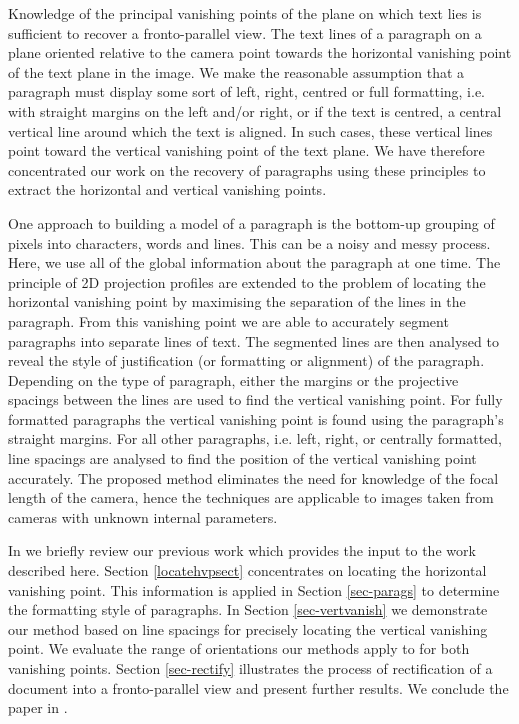 \documentclass{elsart}   %
\begin{document}
Knowledge of the principal vanishing points of the plane on which text lies is
sufficient to recover a fronto-parallel view. The text lines of a paragraph
on a plane oriented relative to the camera  point towards
the horizontal vanishing point of the text plane in the image. We make the
reasonable assumption that a paragraph must display some sort of
 left,  right, centred or full  formatting, i.e. with straight margins on the
left and/or right, or if the text is centred, a central vertical line around which
the text is aligned.  In such cases, these vertical lines point toward the
vertical vanishing point of the text plane.  We have therefore concentrated our
work on the recovery of paragraphs using these principles to extract the
horizontal and vertical vanishing points. 

One approach to building a model of a paragraph is the bottom-up grouping of
pixels into characters, words and lines. This can be a noisy and messy
process. Here, we use all of the global information about the paragraph at one
time.  The principle of 2D projection profiles are extended to the problem of
locating the horizontal vanishing point by maximising the separation of the
lines in the paragraph.  From this vanishing point we are able to accurately
segment paragraphs into separate lines of text.  The segmented lines are then
analysed to reveal the style of justification (or formatting or alignment) of
the paragraph. Depending on the type of paragraph, either the margins or the
projective spacings between the lines are used to find the vertical vanishing
point. For fully formatted paragraphs the vertical vanishing point is found
using the paragraph's straight margins. For all other paragraphs, i.e. left,
right, or centrally formatted, line spacings are analysed to find the position
of the vertical vanishing point accurately. The proposed method eliminates the
need for knowledge of the focal length of the camera, hence the techniques are
applicable to images taken from cameras with unknown internal parameters.

 
In  we briefly review our previous work which
provides the input to the work described here.  Section \ref{locatehvpsect}
concentrates on locating the horizontal vanishing point. This information is
applied in Section \ref{sec-parags} to determine the formatting style of paragraphs.
In Section \ref{sec-vertvanish} we demonstrate our method based on line spacings
for precisely locating the vertical vanishing point. We evaluate the range of
orientations our methods apply to for both vanishing points. Section
\ref{sec-rectify} illustrates the process of rectification of a document into a
fronto-parallel view and present further results. We conclude the paper in
.
\end{document}
